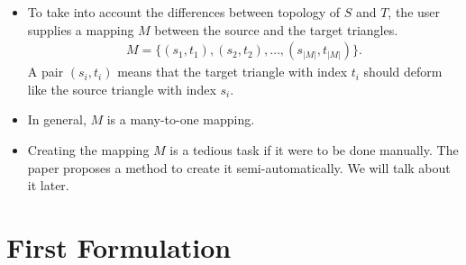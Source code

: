 \documentclass[10pt]{article}
\begin{document}
\begin{itemize}
    
    \item To take into account the differences between topology of $S$ and $T$, the user supplies a mapping $M$ between the source and the target triangles.
    \begin{align*}
        M = \{(s_1, t_1), (s_2, t_2), \ldots, (s_{|M|}, t_{|M|})\}.
    \end{align*}
    A pair $(s_i, t_i)$ means that the target triangle with index $t_i$ should deform like the source triangle with index $s_i$.

    \item In general, $M$ is a many-to-one mapping.
    
    \item Creating the mapping $M$ is a tedious task if it were to be done manually. The paper proposes a method to create it semi-automatically. We will talk about it later.
\end{itemize}

\section{First Formulation}
\end{document}
